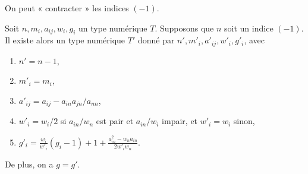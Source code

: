 \noindent
On peut « contracter » les indices $(-1)$.

\begin{lemma}
\label{lemma-contract}
Soit $n, m_i, a_{ij}, w_i, g_i$ un type numérique $T$.
Supposons que $n$ soit un indice $(-1)$. Il existe alors un type
numérique $T'$ donné par $n', m'_i, a'_{ij}, w'_i, g'_i$, avec
\begin{enumerate}
\item $n' = n - 1$,
\item $m'_i = m_i$,
\item $a'_{ij} = a_{ij} - a_{in}a_{jn}/a_{nn}$,
\item $w'_i = w_i/2$ si $a_{in}/w_n$ est pair et $a_{in}/w_i$ impair,
et $w'_i = w_i$ sinon,
\item $g'_i =
\frac{w_i}{w'_i}(g_i - 1) + 1 + \frac{a_{in}^2 - w_na_{in}}{2w'_iw_n}$.
\end{enumerate}
De plus, on a $g = g'$.
\end{lemma}

